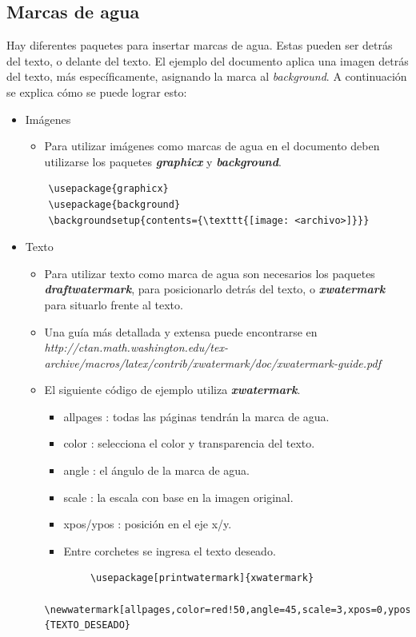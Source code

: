 \documentclass[10pt,journal,compsoc]{IEEEtran}
\begin{document}
\subsection{Marcas de agua}
Hay diferentes paquetes para insertar marcas de agua. Estas pueden ser detr\'as del texto, o delante del texto. El ejemplo del documento aplica una imagen detr\'as del texto, m\'as espec\'ificamente, asignando la marca al \emph{background}. A continuaci\'on se explica c\'omo se puede lograr esto:
\begin{itemize}
	\item Im\'agenes
	\begin{itemize}
		\item Para utilizar im\'agenes como marcas de agua en el documento deben utilizarse los paquetes \textbf{\textit{graphicx}} y \textbf{\textit{background}}.	
	\end{itemize}
	\begin{lstlisting}
	\usepackage{graphicx}
	\usepackage{background}
	\backgroundsetup{contents={\texttt{[image: <archivo>]}}}
	\end{lstlisting}
	\item Texto
	\begin{itemize}
		\item Para utilizar texto como marca de agua son necesarios los paquetes \textbf{\textit{draftwatermark}}, para posicionarlo detr\'as del texto, o \textbf{\textit{xwatermark}} para situarlo frente al texto.
		\item Una gu\'ia m\'as detallada y extensa puede encontrarse en \emph{http://ctan.math.washington.edu/tex-archive/macros/latex/contrib/xwatermark/doc/xwatermark-guide.pdf}
		\item El siguiente c\'odigo de ejemplo utiliza \textbf{\textit{xwatermark}}.
		\begin{itemize}
			\item allpages : todas las p\'aginas tendr\'an la marca de agua.
			\item color : selecciona el color y transparencia del texto.
			\item angle : el \'angulo de la marca de agua.
			\item scale : la escala con base en la imagen original.
			\item xpos/ypos : posici\'on en el eje x/y.
			\item Entre corchetes se ingresa el texto deseado.
		\end{itemize}	
		\begin{lstlisting}
		\usepackage[printwatermark]{xwatermark}
		\newwatermark[allpages,color=red!50,angle=45,scale=3,xpos=0,ypos=0]{TEXTO_DESEADO}
		\end{lstlisting}
	\end{itemize}
\end{itemize}
\end{document}
